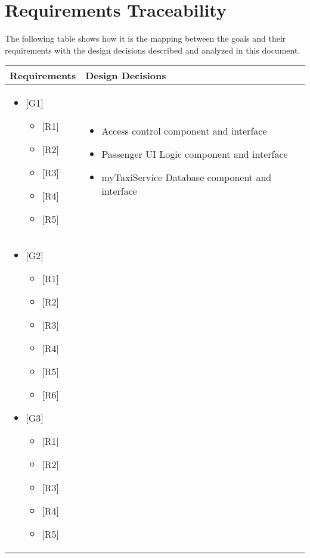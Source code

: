 \newpage
\section{Requirements Traceability}
The following table shows how it is the mapping between the goals and their requirements with the design decisions described and analyzed in this document.
\begin{center}
\def\arraystretch{1.5}
\begin{longtable}{|p{}|p{}|}
	\hline
	Requirements & Design Decisions \\
	\hline\MPtrue
	\begin{itemize}
		\item {[}G1{]}
	\begin{itemize}
		\item {[}R1{]}
		\item {[}R2{]}
		\item {[}R3{]}
		\item {[}R4{]}
		\item {[}R5{]}
	\end{itemize}\end{itemize} & \MPtrue\begin{itemize}
	\item Access control component and interface
	\item Passenger UI Logic component and interface
	\item myTaxiService Database component and interface
	\end{itemize} \\
	\hline\MPtrue
	\begin{itemize}
		\item {[}G2{]}
	\begin{itemize}
		\item {[}R1{]}
		\item {[}R2{]}
		\item {[}R3{]}
		\item {[}R4{]}
		\item {[}R5{]}
		\item {[}R6{]}
	\end{itemize}
	\item {[}G3{]}
	\begin{itemize}
		\item {[}R1{]}
		\item {[}R2{]}
		\item {[}R3{]}
		\item {[}R4{]}
		\item {[}R5{]}

\end{itemize}
\end{itemize}
\end{longtable}
\end{center}

